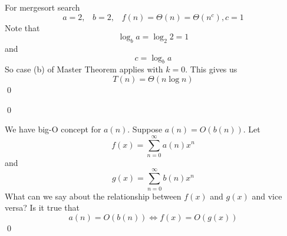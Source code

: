 \begin{eg}
  For mergesort search
  \[
  a = 2, \,\,\,\,\, b = 2, \,\,\,\,\, f(n) = \Theta(n) = \Theta(n^c), c = 1
  \]
  Note that
  \[
  \log_b a = \log_2 2 = 1
  \]
  and
  \[
  c = \log_b a
  \]
  So case (b) of Master Theorem applies with $k = 0$.
  This gives us
  \[
  T(n) = \Theta(n \log n)
  \]
  \qed
\end{eg}
\qed

\begin{ex}
We have big-O concept for $a(n)$.
Suppose $a(n) = O(b(n))$.
Let
\[
f(x) = \sum_{n = 0}^\infty a(n) x^n
\]
and
\[
g(x) = \sum_{n = 0}^\infty b(n) x^n
\]
What can we say about the relationship between $f(x)$ and $g(x)$ and
vice versa?
Is it true that
\[
a(n) = O(b(n)) \iff f(x) = O(g(x))
\]
\qed
\end{ex}
